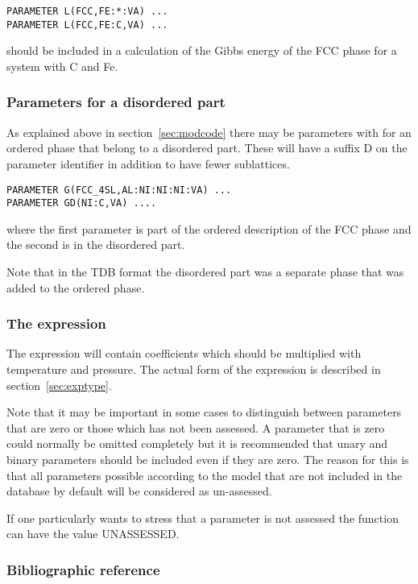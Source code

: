 \documentclass[12pt]{article}
\begin{document}
\begin{verbatim}
PARAMETER L(FCC,FE:*:VA) ...
PARAMETER L(FCC,FE:C,VA) ...
\end{verbatim}

should be included in a calculation of the Gibbs energy of the FCC
phase for a system with C and Fe.

\subsubsection{Parameters for a disordered part}\label{sec:suffixd}

As explained above in section~\ref{sec:modcode} there may be parameters
with for an ordered phase that belong to a disordered part.  These
will have a suffix D on the parameter identifier in addition to have
fewer sublattices.

\begin{verbatim}
PARAMETER G(FCC_4SL,AL:NI:NI:NI:VA) ...
PARAMETER GD(NI:C,VA) ....
\end{verbatim}
where the first parameter is part of the ordered description of the
FCC phase and the second is in the disordered part.

Note that in the TDB format the disordered part was a separate phase
that was added to the ordered phase.

\subsubsection{The expression}

The expression will contain coefficients which should be multiplied
with temperature and pressure.  The actual form of the expression is
described in section~\ref{sec:exptype}.

Note that it may be important in some cases to distinguish between
parameters that are zero or those which has not been assessed.  A
parameter that is zero could normally be omitted completely but it is
recommended that unary and binary parameters should be included even
if they are zero.  The reason for this is that all parameters possible
according to the model that are not included in the database by
default will be considered as un-assessed.

If one particularly wants to stress that a parameter is not assessed
the function can have the value UNASSESSED.

\subsubsection{Bibliographic reference}
\end{document}

